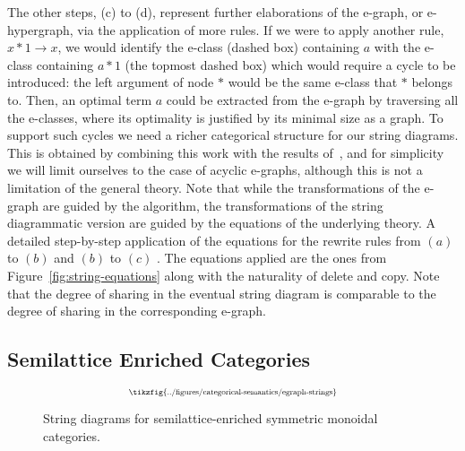 The other steps, (c) to (d), represent further elaborations of the e-graph, or e-hypergraph, via the application of more rules.
If we were to apply another rule, $x * 1 \to x$, we would identify the e-class (dashed box) containing $a$ with the e-class containing $a * 1$ (the topmost dashed box) which would require a cycle to be introduced: the left argument of node $*$ would be the same e-class that $*$ belongs to.
Then, an optimal term $a$ could be extracted from the e-graph by traversing all the e-classes, where its optimality is justified by its minimal size as a graph.
To support such cycles we need a richer categorical structure for our string diagrams.
This is obtained by combining this work with the results of~\cite{ghica_rewriting_2023}, and for simplicity we will limit ourselves to the case of acyclic e-graphs, although this is not a limitation of the general theory.
Note that while the transformations of the e-graph are guided by the algorithm, the transformations of the string diagrammatic version are guided by the equations of the underlying theory.
A detailed step-by-step application of the equations for the rewrite rules from $(a)$ to $(b)$ and $(b)$ to $(c)$ .
The equations applied are the ones from Figure~\ref{fig:string-equations} along with the naturality of delete and copy.
Note that the degree of sharing in the eventual string diagram is comparable to the degree of sharing in the corresponding e-graph.

\subsection{Semilattice Enriched Categories}

\begin{figure}
\[
	\scalebox{0.65}{
	\tikzfig{../figures/categorical-semantics/egraph-strings}
	}
\]
\captionsetup{skip=0pt, belowskip=-4ex}
\caption{String diagrams for semilattice-enriched symmetric monoidal categories.}
\label{fig:egraph-strings}
\end{figure}

